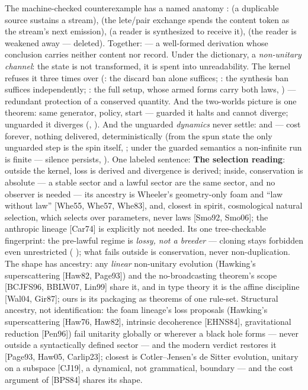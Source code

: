 \documentclass[11pt]{article}
\begin{document}
The machine-checked counterexample has a named anatomy \meas{}:
 (a duplicable source sustains a stream),
 (the lete/pair exchange spends the content token as the
stream's next emission),  (a reader is synthesized to
receive it),  (the reader is weakened away --- deleted).
Together:  \meas{} --- a well-formed
derivation whose conclusion carries neither content nor record. Under the
dictionary, a \emph{non-unitary channel}: the state is not transformed, it is
spent into unreadability. \interp{} The kernel refuses it three times over
(: the discard ban alone suffices;
: the synthesis ban suffices
independently; : the full setup, whose armed
forms carry both laws,  \meas{}) ---
redundant protection of a conserved quantity. \interp{} And the
two-worlds picture is one theorem: same generator, policy, start ---
guarded it halts and cannot diverge; unguarded it diverges
(, 
\meas{}). And the unguarded
\emph{dynamics} never settle:  and
 \meas{} --- cost forever, nothing
delivered, deterministically (from the spun state the only unguarded step is
the spin itself,  \meas{}; under the guarded
semantics a non-infinite run is finite --- silence persists,
 \meas{}). One labeled sentence:  \textbf{The selection reading}: outside the kernel, loss is derived and
divergence is derived; inside, conservation is absolute --- a stable sector
and a lawful sector are the same sector, and no observer is needed --- its
ancestry is Wheeler's geometry-only foam and ``law without law'' [Whe55,
Whe57, Whe83], and, closest in spirit, cosmological natural selection,
which selects over parameters, never laws [Smo92, Smo06]; the anthropic
lineage [Car74] is explicitly not needed. Its one
tree-checkable fingerprint: the pre-lawful regime is \emph{lossy, not a
breeder} --- cloning stays forbidden even unrestricted (
\meas{}); what fails outside is conservation, never non-duplication. The
shape has ancestry: any \emph{linear} non-unitary evolution (Hawking's
superscattering [Haw82, Page93]) and the no-broadcasting theorem's scope
[BCJFS96, BBLW07, Lin99] share it, and in type theory it is the affine
discipline [Wal04, Gir87]; ours is its packaging as theorems of one
rule-set. Structural ancestry, not identification: the foam lineage's loss
proposals (Hawking's superscattering [Haw76, Haw82], intrinsic decoherence
[EHNS84], gravitational reduction [Pen96]) fail unitarity globally or
wherever a black hole forms --- never outside a syntactically defined sector
--- and the modern verdict restores it [Page93, Haw05, Carlip23]; closest is
Cotler--Jensen's de Sitter evolution, unitary on a subspace [CJ19], a
dynamical, not grammatical, boundary --- and the cost argument of [BPS84]
shares its shape. \interp{}
\end{document}
